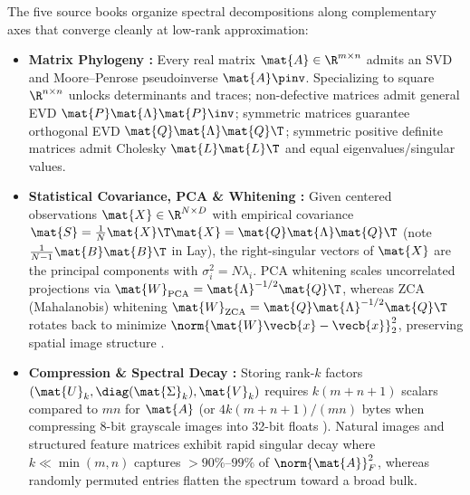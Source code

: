 \documentclass[../../../../master.tex]{subfiles}
\begin{document}
\begin{crossbook}
The five source books organize spectral decompositions along complementary axes that converge cleanly at low-rank approximation:
\begin{itemize}
  \item \textbf{Matrix Phylogeny :} Every real matrix $\mat{A} \in \R^{m\times n}$ admits an SVD and Moore--Penrose pseudoinverse $\mat{A}\pinv$. Specializing to square $\R^{n\times n}$ unlocks determinants and traces; non-defective matrices admit general EVD $\mat{P}\mat{\Lambda}\mat{P}\inv$; symmetric matrices guarantee orthogonal EVD $\mat{Q}\mat{\Lambda}\mat{Q}\T$; symmetric positive definite matrices admit Cholesky $\mat{L}\mat{L}\T$ and equal eigenvalues/singular values.
  \item \textbf{Statistical Covariance, PCA \& Whitening  :} Given centered observations $\mat{X} \in \R^{N \times D}$ with empirical covariance $\mat{S} = \frac{1}{N}\mat{X}\T\mat{X} = \mat{Q}\mat{\Lambda}\mat{Q}\T$ (note $\frac{1}{N-1}\mat{B}\mat{B}\T$ in Lay), the right-singular vectors of $\mat{X}$ are the principal components with $\sigma_i^2 = N\lambda_i$. PCA whitening scales uncorrelated projections via $\mat{W}_{\text{PCA}} = \mat{\Lambda}^{-1/2}\mat{Q}\T$, whereas ZCA (Mahalanobis) whitening $\mat{W}_{\text{ZCA}} = \mat{Q}\mat{\Lambda}^{-1/2}\mat{Q}\T$ rotates back to minimize $\norm{\mat{W}\vecb{x} - \vecb{x}}_2^2$, preserving spatial image structure .
  \item \textbf{Compression \& Spectral Decay  :} Storing rank-$k$ factors $(\mat{U}_k, \diag(\mat{\Sigma}_k), \mat{V}_k)$ requires $k(m+n+1)$ scalars compared to $mn$ for $\mat{A}$ (or $4k(m+n+1)/(mn)$ bytes when compressing 8-bit grayscale images into 32-bit floats ). Natural images and structured feature matrices exhibit rapid singular decay where $k \ll \min(m,n)$ captures $>90\%$--$99\%$ of $\norm{\mat{A}}_F^2$, whereas randomly permuted entries flatten the spectrum toward a broad bulk.
\end{itemize}
\end{crossbook}
\end{document}
